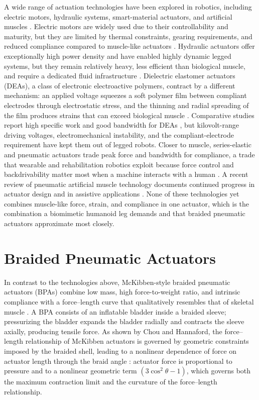 A wide range of actuation technologies have been explored in robotics, including electric motors, hydraulic systems, smart-material actuators, and artificial muscles \citep{he_mechanism_2020, liang_comparative_2020}. Electric motors are widely used due to their controllability and maturity, but they are limited by thermal constraints, gearing requirements, and reduced compliance compared to muscle-like actuators \citep{veale_towards_2016, suzumori_trends_2018}. Hydraulic actuators offer exceptionally high power density and have enabled highly dynamic legged systems, but they remain relatively heavy, less efficient than biological muscle, and require a dedicated fluid infrastructure \citep{suzumori_trends_2018}. Dielectric elastomer actuators (DEAs), a class of electronic electroactive polymers, contract by a different mechanism: an applied voltage squeezes a soft polymer film between compliant electrodes through electrostatic stress, and the thinning and radial spreading of the film produces strains that can exceed biological muscle \citep{madden_artificial_2004}. Comparative studies report high specific work and good bandwidth for DEAs \citep{liang_comparative_2020}, but kilovolt-range driving voltages, electromechanical instability, and the compliant-electrode requirement have kept them out of legged robots. Closer to muscle, series-elastic and pneumatic actuators trade peak force and bandwidth for compliance, a trade that wearable and rehabilitation robotics exploit because force control and backdrivability matter most when a machine interacts with a human \citep{aksoz_design_2019, leibach_development_2020, li_influence_2020}. A recent review of pneumatic artificial muscle technology documents continued progress in actuator design and in assistive applications \citep{zhagiparova_recent_2025}. None of these technologies yet combines muscle-like force, strain, and compliance in one actuator, which is the combination a biomimetic humanoid leg demands and that braided pneumatic actuators approximate most closely.

\section{Braided Pneumatic Actuators}\label{sec:bg_bpa}

In contrast to the technologies above, McKibben-style braided pneumatic actuators (BPAs) combine low mass, high force-to-weight ratio, and intrinsic compliance with a force--length curve that qualitatively resembles that of skeletal muscle \citep{liang_comparative_2020, hunt_modeling_2017}. A BPA consists of an inflatable bladder inside a braided sleeve; pressurizing the bladder expands the bladder radially and contracts the sleeve axially, producing tensile force. As shown by Chou and Hannaford, the force--length relationship of McKibben actuators is governed by geometric constraints imposed by the braided shell, leading to a nonlinear dependence of force on actuator length through the braid angle \citep{chou_measurement_1996}: actuator force is proportional to pressure and to a nonlinear geometric term $(3\cos^2\theta - 1)$, which governs both the maximum contraction limit and the curvature of the force--length relationship.

